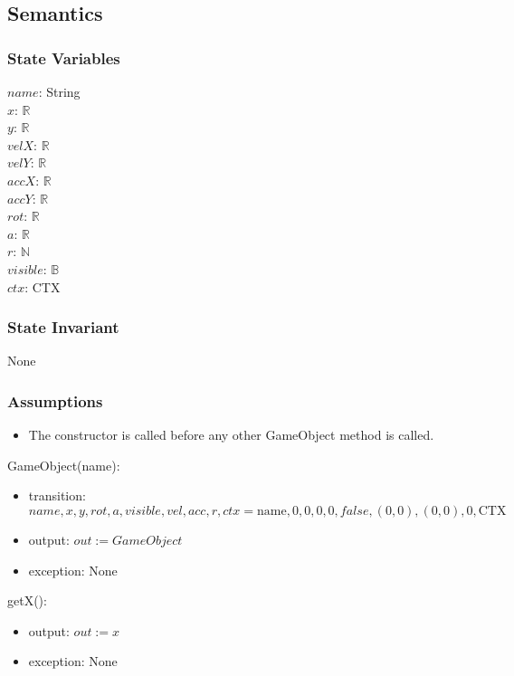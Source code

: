 \documentclass[12pt]{article}
\begin{document}
\subsection* {Semantics}

\subsubsection* {State Variables}

$name$: String\\
$x$: $\mathbb{R}$\\
$y$: $\mathbb{R}$\\
$velX$: $\mathbb{R}$\\
$velY$: $\mathbb{R}$\\
$accX$: $\mathbb{R}$\\
$accY$: $\mathbb{R}$\\
$rot$: $\mathbb{R}$\\
$a$: $\mathbb{R}$\\
$r$: $\mathbb{N}$\\
$visible$: $\mathbb{B}$\\
$ctx$: CTX\\

\subsubsection* {State Invariant}

None

\subsubsection* {Assumptions}

\begin{itemize}
  \item The constructor is called before any other GameObject method is called.
\end{itemize}

GameObject(name):
\begin{itemize}
    \item transition: $name, x, y, rot, a, visible, vel, acc, r, ctx = \mbox{name}, 0, 0, 0, 0, false, (0,0), (0,0), 0, \mbox{CTX}$
    \item output: $out := GameObject$
    \item exception: None
\end{itemize}

\noindent getX():
\begin{itemize}
    \item output: $out := x$
    \item exception: None
\end{itemize}
\end{document}
